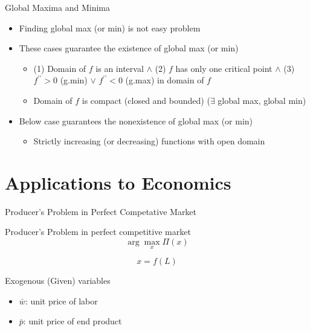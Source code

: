 \documentclass[final]{beamer}
\begin{document}
\begin{frame}[t]{Global Maxima and Minima}
	\begin{itemize}
		\item Finding global max (or min) is not easy problem
		\item These cases guarantee the existence of global max (or min)
		\begin{itemize}
			\item (1) Domain of $f$ is an interval $\land$ (2) $f$ has only one critical point $\land$ (3) $f^{\prime\prime}>0$ (g.min) $\lor$ $f^{\prime\prime}<0$ (g.max) in domain of $f$
			\item Domain of $f$ is compact (closed and bounded)    ($\exists$ global max, global min)
		\end{itemize}
		\item Below case guarantees the nonexistence of global max (or min)
		\begin{itemize}
			\item Strictly increasing (or decreasing) functions with open domain
		\end{itemize}
	\end{itemize}
\end{frame}

\section{Applications to Economics} %
\label{sec:applications_to_economics}
\begin{frame}[t]{Producer's Problem in Perfect Competative Market}
	
	\begin{block}
		{Producer's Problem in perfect competitive market}
		\[
			\arg\max_x \Pi(x)
		\]
	\end{block}
	\[
		x=f(L) \tag{Production Function}
	\]
	\begin{block}
		{Exogenous (Given) variables}
		\begin{itemize}
			\item $\bar w$: unit price of labor
			\item $\bar p$: unit price of end product
		\end{itemize}
	\end{block}
\end{frame}
\end{document}
